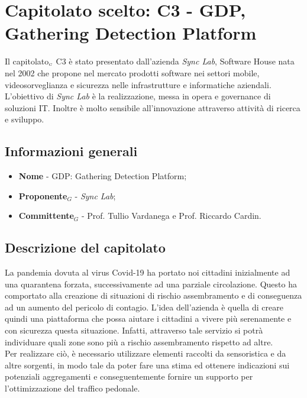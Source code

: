 \chapter{Capitolato scelto: C3 - GDP, Gathering Detection Platform} \label{CapitolatoC3}

Il capitolato$_{\scaleto{G}{3pt}}$ C3 è stato presentato dall'azienda \textit{Sync Lab}, Software House  nata nel 2002 che propone nel mercato prodotti software nei settori mobile, videosorveglianza e sicurezza nelle infrastrutture e informatiche aziendali. L’obiettivo di \textit{Sync Lab} è la realizzazione, messa in opera e governance di soluzioni IT. Inoltre è molto sensibile all'innovazione attraverso attività di ricerca  e sviluppo.

\section{Informazioni generali} \label{C3InformazioniGenerali}
\begin{itemize}
	\item \textbf{Nome} - GDP: Gathering Detection Platform;
	\item \textbf{Proponente}$_G$ - \textit{Sync Lab};
	\item \textbf{Committente}$_G$ - Prof. Tullio Vardanega e Prof. Riccardo Cardin.
\end{itemize}
\section{Descrizione del capitolato} \label{C3DescrizioneDelCapitolato}
La pandemia dovuta al  virus Covid-19 ha portato noi cittadini inizialmente ad una quarantena forzata, successivamente ad una parziale circolazione. Questo ha comportato alla creazione di situazioni di rischio assembramento e di conseguenza ad un aumento del  pericolo di contagio. L'idea dell'azienda è quella di creare quindi una piattaforma che possa aiutare i cittadini a vivere più serenamente e con sicurezza questa situazione. Infatti, attraverso tale servizio si potrà individuare quali zone sono più a rischio assembramento rispetto ad altre. \\
Per realizzare ciò, è necessario utilizzare elementi raccolti da sensoristica e da altre sorgenti, in modo tale da poter fare una stima ed ottenere indicazioni sui potenziali aggregamenti e conseguentemente fornire un supporto per l'ottimizzazione del traffico pedonale.
